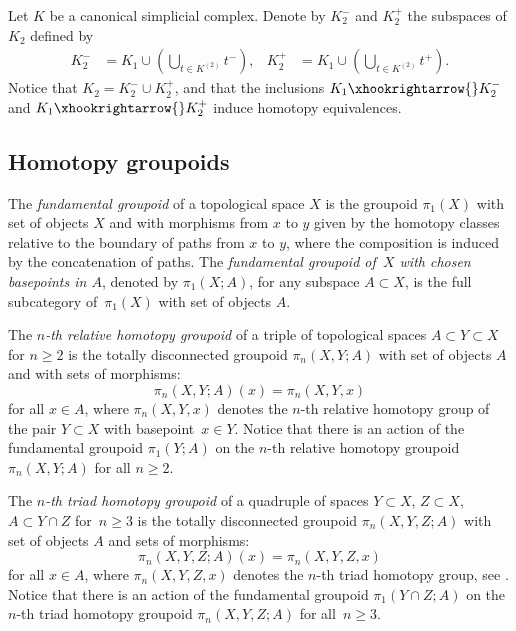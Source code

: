 \documentclass[a4paper, oneside]{amsart}
\numberwithin{equation}{subsection}
\theoremstyle{referencedlemma}
\theoremstyle{plain} %
\theoremstyle{remark}
\begin{document}
\begin{figure}[h]
\centering

\end{figure}

Let $K$ be a canonical simplicial complex. Denote by $K_2^-$ and $K_2^+$ the subspaces of $K_2$ defined by
\begin{align*}
K_2^- &= K_1 \cup \left(\bigcup\limits_{t \in K^{(2)}} t^-\right), &
K_2^+ &= K_1 \cup \left(\bigcup\limits_{t \in K^{(2)}} t^+\right).
\end{align*}
Notice that $K_2 = K_2^- \cup K_2^+$, and that the inclusions $K_1 \xhookrightarrow{} K_2^-$ and $K_1\xhookrightarrow{} K_2^+$ induce homotopy equivalences.

\subsection{Homotopy groupoids} The \emph{fundamental groupoid} of a topological space $X$ is the groupoid $\pi_1(X)$ with set of objects $X$ and with morphisms from $x$ to $y$ given by the homotopy classes relative to the boundary of paths from $x$ to $y$, where the composition is induced by the concatenation of paths. The \emph{fundamental groupoid of~$X$ with chosen basepoints in $A$}, denoted by $\pi_1(X;A)$, for any subspace $A\subset X$, is the full subcategory of~$\pi_1(X)$ with set of objects $A$.

The \emph{$n$-th relative homotopy groupoid} of a triple of topological spaces $A\subset Y \subset X$ for $n\geqslant 2$ is the totally disconnected groupoid $\pi_n(X, Y;A)$ with set of objects $A$ and with sets of morphisms:
\begin{equation*}
\pi_n(X,Y;A)(x) = \pi_n(X,Y,x)
\end{equation*}
for all $x\in A$, where $\pi_n(X,Y,x)$ denotes the $n$-th relative homotopy group of the pair $Y\subset X$ with basepoint~\mbox{$x\in Y$}.  Notice that there is an action of the fundamental groupoid $\pi_1(Y;A)$ on the $n$-th relative homotopy groupoid $\pi_n(X,Y;A)$ for all $n\geqslant 2$.

The \emph{$n$-th triad homotopy groupoid} of a quadruple of spaces $Y \subset X$, $Z\subset X$, $A\subset Y\cap Z$ for~$n\geqslant 3$ is the totally disconnected groupoid $\pi_n(X,Y,Z;A)$ with set of objects $A$ and sets of morphisms:
\begin{equation*}
\pi_n(X,Y,Z;A)(x) = \pi_n(X,Y,Z,x)
\end{equation*}
for all $x\in A$, where $\pi_n(X,Y,Z,x)$ denotes the $n$-th triad homotopy group, see \cite{blakers_homotopy_1949}. Notice that there is an action of the fundamental groupoid $\pi_1(Y\cap Z; A)$ on the $n$-th triad homotopy groupoid $\pi_n(X,Y,Z;A)$ for all~$n\geqslant 3$.
\end{document}
